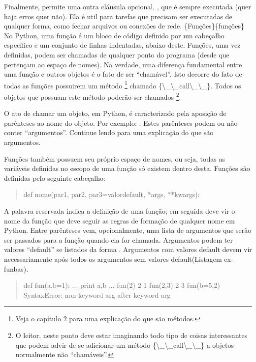 \documentclass[a4paper,10pt,portuguese]{sphinxmanual}
\begin{document}
Finalmente,  permite uma outra cláusula opcional,
, que é sempre executada (quer haja erros quer não). Ela
é util para tarefas que precisam ser executadas de qualquer forma,
como fechar arquivos ou conexões de rede. \{Funções\}\{funções\} No
Python, uma função é um bloco de código definido por um cabeçalho
específico e um conjunto de linhas indentadas, abaixo deste.
Funções, uma vez definidas, podem ser chamadas de qualquer ponto do
programa (desde que pertençam ao espaço de nomes). Na verdade, uma
diferença fundamental entre uma função e outros objetos é o fato de
ser ``chamável''. Isto decorre do fato de todas as funções possuirem
um método \footnote{
Veja o capítulo 2 para uma explicação do que são métodos.
} chamado \{\textbackslash{}\_\textbackslash{}\_call\textbackslash{}\_\textbackslash{}\_\}. Todos os objetos que
possuam este método poderão ser chamados \footnote{
O leitor, neste ponto deve estar imaginando todo tipo de coisas
interessantes que podem advir de se adicionar um método
\{\textbackslash{}\_\textbackslash{}\_call\textbackslash{}\_\textbackslash{}\_\} a objetos normalmente não ``chamáveis''.
}.

O ato de chamar um objeto, em Python, é caracterizado pela aposição
de parênteses ao nome do objeto. Por exemplo: . Estes
parênteses podem ou não conter ``argumentos''. Continue lendo para
uma explicação do que são argumentos.

Funções também possuem seu próprio espaço de nomes, ou seja, todas
as variáveis definidas no escopo de uma função só existem dentro
desta. Funções são definidas pelo seguinte cabeçalho:
\begin{quote}

def nome(par1, par2, par3=valordefault, *args, **kwargs):
\end{quote}

A palavra reservada  indica a definição de uma função; em
seguida deve vir o nome da função que deve seguir as regras de
formação de qualquer nome em Python. Entre parênteses vem,
opcionalmente, uma lista de argumentos que serão ser passados para
a função quando ela for chamada. Argumentos podem ter valores
``default'' se listados da forma . Argumentos com valores
default devem vir necessariamente após todos os argumentos sem
valores default(Listagem ex-funbas).
\begin{quote}

def fun(a,b=1): ... print a,b ... fun(2) 2 1 fun(2,3) 2 3
fun(b=5,2) SyntaxError: non-keyword arg after keyword arg
\end{quote}
\end{document}
